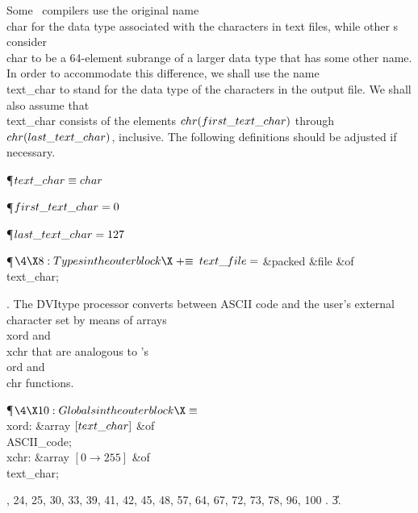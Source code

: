 Some \PASCAL\ compilers use the original name \\{char} for the data type
associated with the characters in text files, while other \PASCAL s
consider \\{char} to be a 64-element subrange of a larger data type that has
some other name.  In order to accommodate this difference, we shall use
the name \\{text\_char} to stand for the data type of the characters in the
output file.  We shall also assume that \\{text\_char} consists of
the elements $\\{chr}(\\{first\_text\_char})$ through $\\{chr}(\\{last\_text%
\_char})$,
inclusive. The following definitions should be adjusted if necessary.

\Y\P\D {}$\\{text\_char}\S\\{char}$\par
\P\D {}$\\{first\_text\_char}=0$\par
\P\D {}$\\{last\_text\_char}=127$\par
\Y\P$\4\X8:Types in the outer block\X\mathrel{+}\S$\6
$\\{text\_file}=$\1\5
\&{packed} \&{file} \1\&{of}\5
\\{text\_char};\2\2\par
\fi

. The \.{DVItype} processor converts between ASCII code and
the user's external character set by means of arrays \\{xord} and \\{xchr}
that are analogous to \PASCAL's \\{ord} and \\{chr} functions.

\Y\P$\4\X10:Globals in the outer block\X\S$\6
\4\\{xord}: \&{array} $[\\{text\_char}]$ \1\&{of}\5
\\{ASCII\_code};\2\6
\4\\{xchr}: \&{array} $[0\to255]$ \1\&{of}\5
\\{text\_char};\2\par
{}, 24, 25, 30, 33, 39, 41, 42, 45, 48, 57, 64, 67, 72, 73, 78, 96, 100%
.
\U3.\fi


